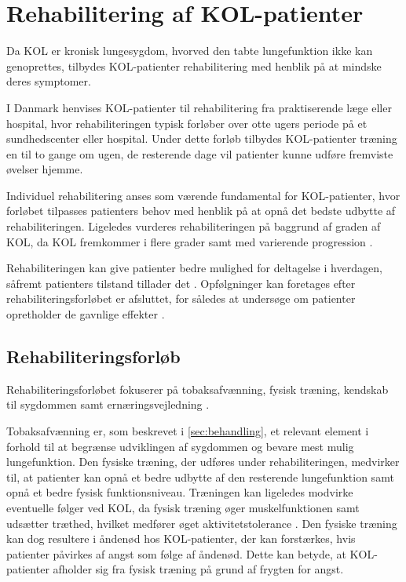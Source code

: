 \section{Rehabilitering af KOL-patienter}
Da KOL er kronisk lungesygdom, hvorved den tabte lungefunktion ikke kan genoprettes, tilbydes KOL-patienter rehabilitering med henblik på at mindske deres symptomer. 

I Danmark henvises KOL-patienter til rehabilitering fra praktiserende læge eller hospital, hvor rehabiliteringen typisk forløber over otte ugers periode på et sundhedscenter eller hospital. Under dette forløb tilbydes KOL-patienter træning en til to gange om ugen, de resterende dage vil patienter kunne udføre fremviste øvelser hjemme.\cite{McCarthy2015,Frausing2011b} 

Individuel rehabilitering anses som værende fundamental for KOL-patienter, hvor forløbet tilpasses patienters behov med henblik på at opnå det bedste udbytte af rehabiliteringen.\cite{McCarthy2015,Habraken2011,Sundhedsstyrelsen2015} Ligeledes vurderes rehabiliteringen på baggrund af graden af KOL, da KOL fremkommer i flere grader samt med varierende progression \cite{McCarthy2015}.

Rehabiliteringen kan give patienter bedre mulighed for deltagelse i hverdagen, såfremt patienters tilstand tillader det \cite{McCarthy2015,Habraken2011, Sundhedsstyrelsen2015}. Opfølgninger kan foretages efter rehabiliteringsforløbet er afsluttet, for således at undersøge om patienter opretholder de gavnlige effekter \cite{Frausing2011b}.


\subsection{Rehabiliteringsforløb}
Rehabiliteringsforløbet fokuserer på tobaksafvænning, fysisk træning, kendskab til sygdommen samt ernæringsvejledning \cite{McCarthy2015,Habraken2011,Sundhedsstyrelsen2015}.

Tobaksafvænning er, som beskrevet i \autoref{sec:behandling}, et relevant element i forhold til at begrænse udviklingen af sygdommen og bevare mest mulig lungefunktion. Den fysiske træning, der udføres under rehabiliteringen, medvirker til, at patienter kan opnå et bedre udbytte af den resterende lungefunktion samt opnå et bedre fysisk funktionsniveau.\cite{Sundhedsstyrelsen2015}
Træningen kan ligeledes modvirke eventuelle følger ved KOL, da fysisk træning øger muskelfunktionen samt udsætter træthed, hvilket medfører øget aktivitetstolerance \cite{McCarthy2015}. Den fysiske træning kan dog resultere i åndenød hos KOL-patienter, der kan forstærkes, hvis patienter påvirkes af angst som følge af åndenød. Dette kan betyde, at KOL-patienter afholder sig fra fysisk træning på grund af frygten for angst.\cite{McCarthy2015, Sundhedsstyrelsen2015} 

